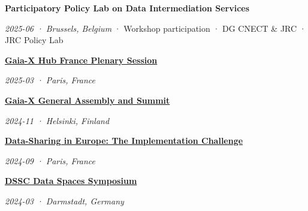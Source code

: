 \documentclass[11pt,a4paper]{article}
\newlength{\cvindent}
\newenvironment{cvblock}[1][1]{%
  \par\noindent\hspace*{#1\cvindent}%
  \begin{minipage}{\dimexpr\linewidth-#1\cvindent\relax}%
}{%
  \end{minipage}\par
}
\newenvironment{cvdetails}{%
  \begin{list}{}{%
    \setlength{\leftmargin}{\cvindent}%
    \setlength{\rightmargin}{0pt}%
    \setlength{\topsep}{0.1em}%
    \setlength{\partopsep}{0pt}%
    \setlength{\parsep}{0.05em}%
    \setlength{\itemsep}{0pt}%
  }\item[]\small\ignorespaces
}{%
  \end{list}
}
\begin{document}
\begin{cvblock}[2]
\textbf{Participatory Policy Lab on Data Intermediation Services}\par
\begin{cvdetails}
{\small\itshape 2025-06 · Brussels, Belgium} · Workshop participation · DG CNECT \& JRC · JRC Policy Lab\par
\end{cvdetails}
\end{cvblock}\par\vspace{0.35em}

\begin{cvblock}[2]
\textbf{\href{https://www.gaia-x-hub.fr/retour-sur-la-7e-pleniere-du-hub-france-24-mars-2025-a-bercy/}{Gaia-X Hub France Plenary Session}}\par
\begin{cvdetails}
{\small\itshape 2025-03 · Paris, France}\par
\end{cvdetails}
\end{cvblock}\par\vspace{0.35em}

\begin{cvblock}[2]
\textbf{\href{https://gaia-x.eu/summit-2024/}{Gaia-X General Assembly and Summit}}\par
\begin{cvdetails}
{\small\itshape 2024-11 · Helsinki, Finland}\par
\end{cvdetails}
\end{cvblock}\par\vspace{0.35em}

\begin{cvblock}[2]
\textbf{\href{https://chairgovreg.fondation-dauphine.fr/en/publication/1809/synthesis-data-sharing-europe-implementation-challenge}{Data-Sharing in Europe: The Implementation Challenge}}\par
\begin{cvdetails}
{\small\itshape 2024-09 · Paris, France}\par
\end{cvdetails}
\end{cvblock}\par\vspace{0.35em}

\begin{cvblock}[2]
\textbf{\href{https://www.data-spaces-symposium.eu/program-2024}{DSSC Data Spaces Symposium}}\par
\begin{cvdetails}
{\small\itshape 2024-03 · Darmstadt, Germany}\par
\end{cvdetails}
\end{cvblock}\par\vspace{0.35em}
\end{document}
